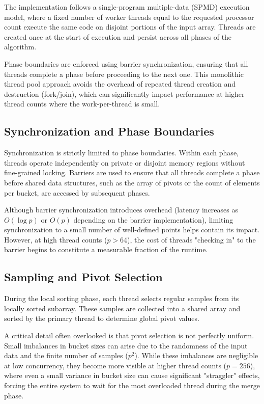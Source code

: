 \documentclass[11pt]{article}
\begin{document}
The implementation follows a single-program multiple-data (SPMD) execution model, where a fixed number of worker threads equal to the requested processor count execute the same code on disjoint portions of the input array. Threads are created once at the start of execution and persist across all phases of the algorithm.

Phase boundaries are enforced using barrier synchronization, ensuring that all threads complete a phase before proceeding to the next one. This monolithic thread pool approach avoids the overhead of repeated thread creation and destruction (fork/join), which can significantly impact performance at higher thread counts where the work-per-thread is small.

\subsection{Synchronization and Phase Boundaries}

Synchronization is strictly limited to phase boundaries. Within each phase, threads operate independently on private or disjoint memory regions without fine-grained locking. Barriers are used to ensure that all threads complete a phase before shared data structures, such as the array of pivots or the count of elements per bucket, are accessed by subsequent phases.

Although barrier synchronization introduces overhead (latency increases as $O(\log p)$ or $O(p)$ depending on the barrier implementation), limiting synchronization to a small number of well-defined points helps contain its impact. However, at high thread counts ($p > 64$), the cost of threads "checking in" to the barrier begins to constitute a measurable fraction of the runtime.

\subsection{Sampling and Pivot Selection}

During the local sorting phase, each thread selects regular samples from its locally sorted subarray. These samples are collected into a shared array and sorted by the primary thread to determine global pivot values.

A critical detail often overlooked is that pivot selection is not perfectly uniform. Small imbalances in bucket sizes can arise due to the randomness of the input data and the finite number of samples ($p^2$). While these imbalances are negligible at low concurrency, they become more visible at higher thread counts ($p=256$), where even a small variance in bucket size can cause significant "straggler" effects, forcing the entire system to wait for the most overloaded thread during the merge phase.
\end{document}
